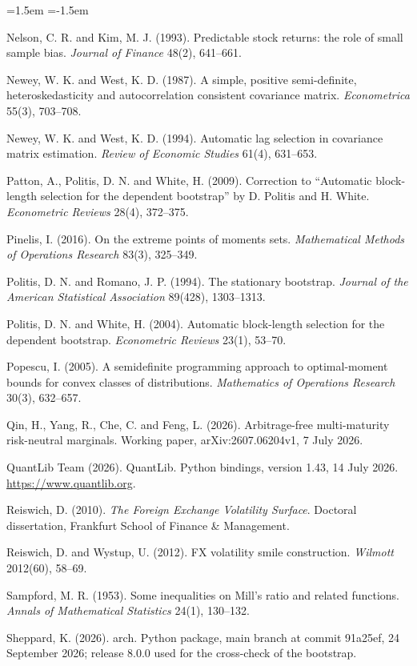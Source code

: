 \documentclass[11pt]{article}
\theoremstyle{result}
\begin{document}
\begin{list}{}{\leftmargin=1.5em \itemindent=-1.5em \itemsep=2pt \parsep=0pt}
\item Nelson, C. R. and Kim, M. J. (1993). Predictable stock returns: the role of small sample bias. \emph{Journal of Finance} 48(2), 641--661.
\item Newey, W. K. and West, K. D. (1987). A simple, positive semi-definite, heteroskedasticity and autocorrelation consistent covariance matrix. \emph{Econometrica} 55(3), 703--708.
\item Newey, W. K. and West, K. D. (1994). Automatic lag selection in covariance matrix estimation. \emph{Review of Economic Studies} 61(4), 631--653.
\item Patton, A., Politis, D. N. and White, H. (2009). Correction to ``Automatic block-length selection for the dependent bootstrap'' by D. Politis and H. White. \emph{Econometric Reviews} 28(4), 372--375.
\item Pinelis, I. (2016). On the extreme points of moments sets. \emph{Mathematical Methods of Operations Research} 83(3), 325--349.
\item Politis, D. N. and Romano, J. P. (1994). The stationary bootstrap. \emph{Journal of the American Statistical Association} 89(428), 1303--1313.
\item Politis, D. N. and White, H. (2004). Automatic block-length selection for the dependent bootstrap. \emph{Econometric Reviews} 23(1), 53--70.
\item Popescu, I. (2005). A semidefinite programming approach to optimal-moment bounds for convex classes of distributions. \emph{Mathematics of Operations Research} 30(3), 632--657.
\item Qin, H., Yang, R., Che, C. and Feng, L. (2026). Arbitrage-free multi-maturity risk-neutral marginals. Working paper, arXiv:2607.06204v1, 7 July 2026.
\item QuantLib Team (2026). QuantLib. Python bindings, version 1.43, 14 July 2026. \url{https://www.quantlib.org}.
\item Reiswich, D. (2010). \emph{The Foreign Exchange Volatility Surface}. Doctoral dissertation, Frankfurt School of Finance \& Management.
\item Reiswich, D. and Wystup, U. (2012). FX volatility smile construction. \emph{Wilmott} 2012(60), 58--69.
\item Sampford, M. R. (1953). Some inequalities on Mill's ratio and related functions. \emph{Annals of Mathematical Statistics} 24(1), 130--132.
\item Sheppard, K. (2026). arch. Python package, main branch at commit 91a25ef, 24 September 2026; release 8.0.0 used for the cross-check of the bootstrap.

\end{list}
\end{document}
